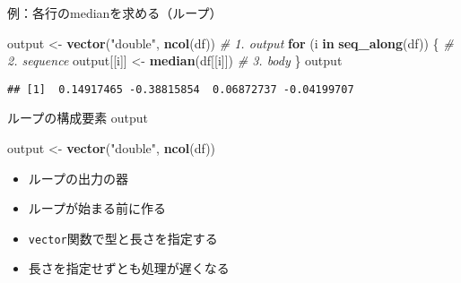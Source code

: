 \documentclass[ignorenonframetext,]{beamer}
\newenvironment{Shaded}{\begin{snugshade}}{\end{snugshade}}
\newcommand{\KeywordTok}[1]{\textcolor[rgb]{0.13,0.29,0.53}{\textbf{#1}}}
\newcommand{\StringTok}[1]{\textcolor[rgb]{0.31,0.60,0.02}{#1}}
\newcommand{\CommentTok}[1]{\textcolor[rgb]{0.56,0.35,0.01}{\textit{#1}}}
\newcommand{\ControlFlowTok}[1]{\textcolor[rgb]{0.13,0.29,0.53}{\textbf{#1}}}
\newcommand{\NormalTok}[1]{#1}
\providecommand{\tightlist}{%
  \setlength{\itemsep}{0pt}\setlength{\parskip}{0pt}}
\begin{document}
\begin{frame}[fragile]{例：各行のmedianを求める（ループ）}

\begin{Shaded}
\begin{Highlighting}[]
\NormalTok{output <-}\StringTok{ }\KeywordTok{vector}\NormalTok{(}\StringTok{"double"}\NormalTok{, }\KeywordTok{ncol}\NormalTok{(df))  }\CommentTok{# 1. output}
\ControlFlowTok{for}\NormalTok{ (i }\ControlFlowTok{in} \KeywordTok{seq_along}\NormalTok{(df)) \{            }\CommentTok{# 2. sequence}
\NormalTok{  output[[i]] <-}\StringTok{ }\KeywordTok{median}\NormalTok{(df[[i]])      }\CommentTok{# 3. body}
\NormalTok{\}}
\NormalTok{output}
\end{Highlighting}
\end{Shaded}

\begin{verbatim}
## [1]  0.14917465 -0.38815854  0.06872737 -0.04199707
\end{verbatim}

\end{frame}

\begin{frame}[fragile]{ループの構成要素 output}

\begin{Shaded}
\begin{Highlighting}[]
\NormalTok{output <-}\StringTok{ }\KeywordTok{vector}\NormalTok{(}\StringTok{"double"}\NormalTok{, }\KeywordTok{ncol}\NormalTok{(df))}
\end{Highlighting}
\end{Shaded}

\begin{itemize}
\tightlist
\item
  ループの出力の器
\item
  ループが始まる前に作る
\item
  \texttt{vector}関数で型と長さを指定する
\item
  長さを指定せずとも処理が遅くなる
\end{itemize}

\end{frame}
\end{document}
